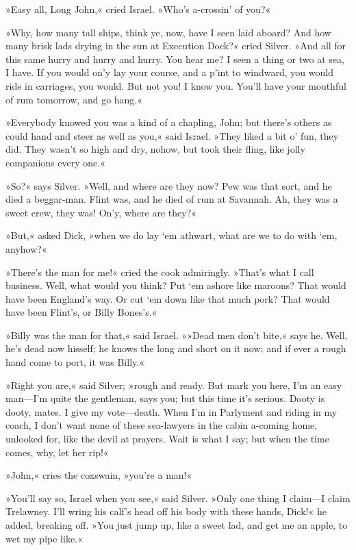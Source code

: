 »Easy all, Long John,« cried Israel. »Who's a-crossin' of you?«

»Why, how many tall ships, think ye, now, have I seen laid aboard? And how many brisk lads drying in the sun at Execution Dock?« cried Silver. »And all for this same hurry and hurry and hurry. You hear me? I seen a thing or two at sea, I have. If you would on'y lay your course, and a p'int to windward, you would ride in carriages, you would. But not you! I know you. You'll have your mouthful of rum tomorrow, and go hang.«

»Everybody knowed you was a kind of a chapling, John; but there's others as could hand and steer as well as you,« said Israel. »They liked a bit o' fun, they did. They wasn't so high and dry, nohow, but took their fling, like jolly companions every one.«

»So?« says Silver. »Well, and where are they now? Pew was that sort, and he died a beggar-man. Flint was, and he died of rum at Savannah. Ah, they was a sweet crew, they was! On'y, where are they?«

»But,« asked Dick, »when we do lay `em athwart, what are we to do with `em, anyhow?«

»There's the man for me!« cried the cook admiringly. »That's what I call business. Well, what would you think? Put `em ashore like maroons? That would have been England's way. Or cut `em down like that much pork? That would have been Flint's, or Billy Bones's.«

»Billy was the man for that,« said Israel. »»Dead men don't bite,« says he. Well, he's dead now hisself; he knows the long and short on it now; and if ever a rough hand come to port, it was Billy.«

»Right you are,« said Silver; »rough and ready. But mark you here, I'm an easy man—I'm quite the gentleman, says you; but this time it's serious. Dooty is dooty, mates. I give my vote—death. When I'm in Parlyment and riding in my coach, I don't want none of these sea-lawyers in the cabin a-coming home, unlooked for, like the devil at prayers. Wait is what I say; but when the time comes, why, let her rip!«

»John,« cries the coxswain, »you're a man!«

»You'll say so, Israel when you see,« said Silver. »Only one thing I claim—I claim Trelawney. I'll wring his calf's head off his body with these hands, Dick!« he added, breaking off. »You just jump up, like a sweet lad, and get me an apple, to wet my pipe like.«


